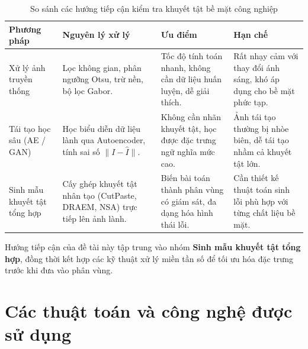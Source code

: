 \begin{table}[h]
\centering
\caption{So sánh các hướng tiếp cận kiểm tra khuyết tật bề mặt công nghiệp}
\label{tab:approach_comparison}
\begin{tabularx}{\textwidth}{p{3.2cm} X X X}
\toprule
\textbf{Phương pháp} & \textbf{Nguyên lý xử lý} & \textbf{Ưu điểm} & \textbf{Hạn chế} \\
\midrule
Xử lý ảnh truyền thống \cite{gonzalez2018} & Lọc không gian, phân ngưỡng Otsu, trừ nền, bộ lọc Gabor. & Tốc độ tính toán nhanh, không cần dữ liệu huấn luyện, dễ giải thích. & Rất nhạy cảm với thay đổi ánh sáng, khó áp dụng cho bề mặt phức tạp. \\
\addlinespace
Tái tạo học sâu (AE / GAN) \cite{bergmann2019} & Học biểu diễn dữ liệu lành qua Autoencoder, tính sai số $\|I - \hat{I}\|$. & Không cần nhãn khuyết tật, học được đặc trưng ngữ nghĩa mức cao. & Ảnh tái tạo thường bị nhòe biên, dễ tái tạo nhầm cả khuyết tật lớn. \\
\addlinespace
Sinh mẫu khuyết tật tổng hợp \cite{li2021, zavrtanik2021, schluter2022} & Cấy ghép khuyết tật nhân tạo (CutPaste, DRAEM, NSA) trực tiếp lên ảnh lành. & Biến bài toán thành phân vùng có giám sát, đa dạng hóa hình thái lỗi. & Cần thiết kế thuật toán sinh lỗi phù hợp với từng chất liệu bề mặt. \\
\bottomrule
\end{tabularx}
\end{table}

Hướng tiếp cận của đề tài này tập trung vào nhóm \textbf{Sinh mẫu khuyết tật tổng hợp}, đồng thời kết hợp các kỹ thuật xử lý miền tần số để tối ưu hóa đặc trưng trước khi đưa vào phân vùng.

\section{Các thuật toán và công nghệ được sử dụng}

